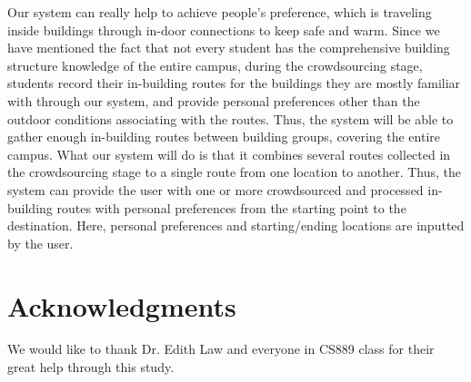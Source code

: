 \documentclass{sigchi}
\begin{document}
Our system can really help to achieve people’s preference, which is traveling inside buildings through in-door connections to keep safe and warm. Since we have mentioned the fact that not every student has the comprehensive building structure knowledge of the entire campus, during the crowdsourcing stage, students record their in-building routes for the buildings they are mostly familiar with through our system, and provide personal preferences other than the outdoor conditions associating with the routes. Thus, the system will be able to gather enough in-building routes between building groups, covering the entire campus. What our system will do is that it combines several routes collected in the crowdsourcing stage to a single route from one location to another. Thus, the system can provide the user with one or more crowdsourced and processed in-building routes with personal preferences from the starting point to the destination. Here, personal preferences and starting/ending locations are inputted by the user.


\section{Acknowledgments}

We would like to thank Dr. Edith Law and everyone in CS889 class for their great help through this study.

\balance



\end{document}
